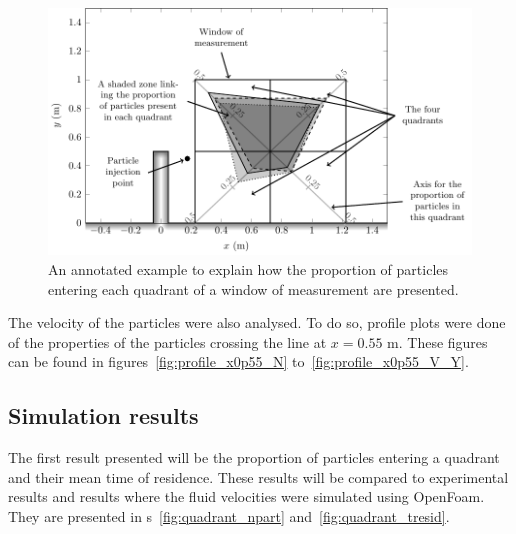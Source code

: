 \begin{figure}[H]%
\begin{center}
%
  \includegraphics[]{./Figures/CanalAlgAnnotatedFigure}
%
\end{center}
\caption
{An annotated example to explain how the proportion of particles entering each quadrant of a window of measurement are presented.}
\label{fig:expe_canal_annotated_example}
\end{figure}

The velocity of the particles were also analysed. To do so, profile plots were done of the properties of the particles crossing the
line at $x=0.55$ m. These figures can be found in figures~\ref{fig:profile_x0p55_N} to~\ref{fig:profile_x0p55_V_Y}.

\subsection{Simulation results}

The first result presented will be the proportion of particles entering a quadrant and their mean time of residence. These results
will be compared to experimental results and results where the fluid velocities were simulated using OpenFoam. They are presented in
\figurename{}s~\ref{fig:quadrant_npart} and~\ref{fig:quadrant_tresid}.

